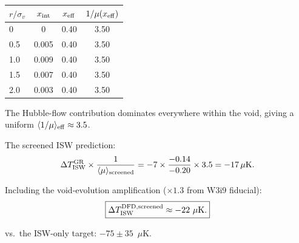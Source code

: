 \documentclass[11pt,a4paper]{article}
\newcommand{\mufd}{\mu}
\begin{document}
\begin{center}
\begin{tabular}{lccc}
\toprule
$r/\sigma_v$ & $x_{\rm int}$ & $x_{\rm eff}$ & $1/\mufd(x_{\rm eff})$ \\
\midrule
0 & 0 & 0.40 & 3.50 \\
0.5 & 0.005 & 0.40 & 3.50 \\
1.0 & 0.009 & 0.40 & 3.50 \\
1.5 & 0.007 & 0.40 & 3.50 \\
2.0 & 0.003 & 0.40 & 3.50 \\
\bottomrule
\end{tabular}
\end{center}

The Hubble-flow contribution dominates everywhere within the void,
giving a uniform $\langle 1/\mufd \rangle_{\rm eff} \approx 3.5$.

The screened ISW prediction:
\begin{equation}
\Delta T_{\rm ISW}^{\rm GR} \times \frac{1}{\langle\mufd\rangle_{\rm screened}}
= -7\times\frac{-0.14}{-0.20}\times 3.5 = -17\,\mu\text{K}.
\end{equation}

Including the void-evolution amplification ($\times 1.3$ from W3i9
fiducial):
\begin{equation}
\boxed{\Delta T_{\rm ISW}^{\rm DFD,screened} \approx -22~\mu\text{K}.}
\end{equation}

vs.\ the ISW-only target: $-75 \pm 35$~$\mu$K.
\end{document}
